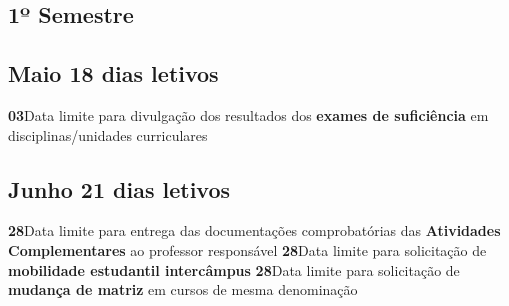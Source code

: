 \documentclass[thesis]{hmcposter}
\begin{document}
\begin{poster}
\section{\hfill \color{hmcorange}1º Semestre}
\subsection{Maio \hfill 18 dias letivos}\textbf{03}\qquad Data limite para divulgação dos resultados dos \textbf{exames de suficiência} em disciplinas/unidades curriculares \newline \null\subsection{Junho \hfill 21 dias letivos}\textbf{28}\qquad Data limite para entrega das documentações comprobatórias das \textbf{Atividades Complementares} ao professor responsável \newline \null\textbf{28}\qquad Data limite para solicitação de \textbf{mobilidade estudantil intercâmpus} \newline \null\textbf{28}\qquad Data limite para solicitação de \textbf{mudança de matriz} em cursos de mesma denominação \newline \null\newpage

\end{poster}
\end{document}
